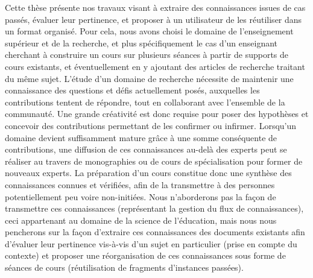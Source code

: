 Cette thèse présente nos travaux visant à extraire des connaissances issues de cas passés, évaluer leur pertinence, et proposer à un utilisateur de les réutiliser dans un format organisé.
Pour cela, nous avons choisi le domaine de l'enseignement supérieur et de la recherche, et plus spécifiquement le cas d'un enseignant cherchant à construire un cours sur plusieurs séances à partir de supports de cours existants, et éventuellement en y ajoutant des articles de recherche traitant du même sujet.
L'étude d'un domaine de recherche nécessite de maintenir une connaissance des questions et défis actuellement posés, auxquelles les contributions tentent de répondre, tout en collaborant avec l'ensemble de la communauté.
Une grande créativité est donc requise pour poser des hypothèses et concevoir des contributions permettant de les confirmer ou infirmer.
Lorsqu'un domaine devient suffisamment mature grâce à une somme conséquente de contributions, une diffusion de ces connaissances au-delà des experts peut se réaliser au travers de monographies ou de cours de spécialisation pour former de nouveaux experts.
La préparation d'un cours constitue donc une synthèse des connaissances connues et vérifiées, afin de la transmettre à des personnes potentiellement peu voire non-initiées.
Nous n'aborderons pas la façon de transmettre ces connaissances (représentant la gestion du flux de connaissances), ceci appartenant au domaine de la science de l'éducation, mais nous nous pencherons sur la façon d'extraire ces connaissances des documents existants afin d'évaluer leur pertinence vis-à-vis d'un sujet en particulier (prise en compte du contexte) et proposer une réorganisation de ces connaissances sous forme de séances de cours (réutilisation de fragments d'instances passées).




\clearpage %
\newpage   %

